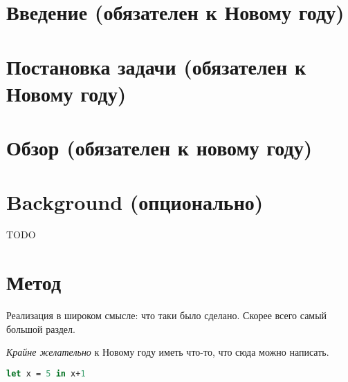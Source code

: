 

\usepackage{caption}
\usepackage{listings}




\maketitle
\setcounter{tocdepth}{2}
\tableofcontents


\section{Введение (обязателен к Новому году)}


\section{Постановка задачи (обязателен к Новому году)}
\label{sec:task}


\section{Обзор (обязателен к новому году)}


\section{Background (опционально)}
TODO


\section{Метод}
Реализация в широком смысле: что таки было сделано. Скорее всего самый большой раздел.

\emph{Крайне желательно} к Новому году иметь что-то, что сюда можно написать.



\begin{lstlisting}[caption=Название, language=Caml, frame=single]
let x = 5 in x+1
\end{lstlisting}


